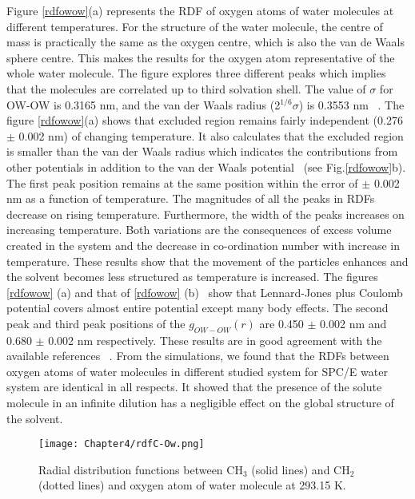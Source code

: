Figure \ref{rdfowow}(a) represents the RDF of oxygen atoms of water molecules at different temperatures. For the structure  of the water molecule, the centre of mass is practically the same as the oxygen centre, which is also the van de Waals sphere centre. This makes the results for the oxygen atom representative of the whole water molecule. The figure explores three different peaks which implies that the molecules are correlated up to third solvation shell. The value of $\sigma$ for OW-OW is 0.3165 nm, and the van der Waals radius (2$^{\mathrm{1/6}}\sigma$) is 0.3553 nm~ \citep{Gromacs-manual}. The figure \ref{rdfowow}(a) shows that excluded region remains fairly independent (0.276 $\pm$ 0.002 nm) of changing temperature. It also calculates that the excluded region is smaller than the van der Waals radius which indicates the contributions from other potentials in addition to the van der Waals potential~\citep{pokharel2018transport, Pokhrel2016} (see Fig.\ref{rdfowow}b). The first peak position remains at the same position within the error of $\pm$ 0.002 nm as a function of temperature. The magnitudes of all the peaks in RDFs decrease on rising temperature. Furthermore, the width of the peaks increases on increasing temperature. Both variations are the consequences of excess volume created in the system and  the  decrease in co-ordination number  with increase in temperature. These results show that the movement of the particles enhances and the solvent becomes less structured as temperature is increased. The  figures \ref{rdfowow} (a) and that  of  \ref{rdfowow} (b)~\citep{pokharel2018transport, Pokhrel2016} show that  Lennard-Jones plus Coulomb potential covers almost entire potential except many body effects. The second peak and third peak positions of the $g_{OW-OW}(r)$  are 0.450 $\pm$ 0.002 nm and 0.680 $\pm$ 0.002 nm respectively. These results are in good agreement with the available references ~\citep{head2006tetrahedral,head2002water}. From the simulations, we  found that the RDFs between oxygen atoms of water molecules in different studied system for SPC/E water system are identical in all respects. It showed that the presence of the solute molecule in an infinite dilution has a negligible effect on the global structure of the solvent.

\begin{figure}[h!]
\centering
\texttt{[image: Chapter4/rdfC-Ow.png]}
\caption[Radial distribution functions between methyl and methylene carbon atoms of alkane-water system and oxygen atom of water molecule.]{Radial distribution functions between $\mathrm{CH_3}$ (solid
lines) and $\mathrm{CH_2}$ (dotted lines) and  oxygen atom of water molecule at 293.15 K.}
\label{rdfC-OW}
\end{figure}

